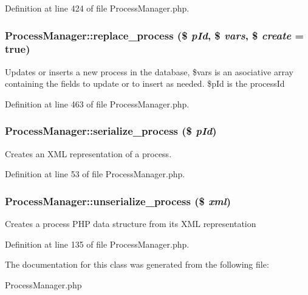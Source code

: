 Definition at line 424 of file Process\-Manager.php.
\subsubsection{\setlength{\rightskip}{0pt plus 5cm}Process\-Manager::replace\_\-process (\$ {\em p\-Id}, \$ {\em vars}, \$ {\em create} = true)}\label{classProcessManager_a12}


Updates or inserts a new process in the database, \$vars is an asociative array containing the fields to update or to insert as needed. \$p\-Id is the process\-Id 

Definition at line 463 of file Process\-Manager.php.
\subsubsection{\setlength{\rightskip}{0pt plus 5cm}Process\-Manager::serialize\_\-process (\$ {\em p\-Id})}\label{classProcessManager_a3}


Creates an XML representation of a process. 

Definition at line 53 of file Process\-Manager.php.
\subsubsection{\setlength{\rightskip}{0pt plus 5cm}Process\-Manager::unserialize\_\-process (\$ {\em xml})}\label{classProcessManager_a4}


Creates a process PHP data structure from its XML representation 

Definition at line 135 of file Process\-Manager.php.

The documentation for this class was generated from the following file:\begin{CompactItemize}
\item 
Process\-Manager.php\end{CompactItemize}
